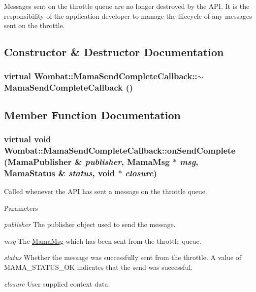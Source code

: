 Messages sent on the throttle queue are no longer destroyed by the API. It is the responsibility of the application developer to manage the lifecycle of any messages sent on the throttle. 

\subsection{Constructor \& Destructor Documentation}
\hypertarget{classWombat_1_1MamaSendCompleteCallback_ad4a151b81e17fecebeeda573bba405c3}{
\subsubsection[{$\sim$MamaSendCompleteCallback}]{\setlength{\rightskip}{0pt plus 5cm}virtual Wombat::MamaSendCompleteCallback::$\sim$MamaSendCompleteCallback ()}}
\label{classWombat_1_1MamaSendCompleteCallback_ad4a151b81e17fecebeeda573bba405c3}


\subsection{Member Function Documentation}
\hypertarget{classWombat_1_1MamaSendCompleteCallback_aa6f6cd10cb4b7b5c84c74056badd365f}{
\subsubsection[{onSendComplete}]{\setlength{\rightskip}{0pt plus 5cm}virtual void Wombat::MamaSendCompleteCallback::onSendComplete ({\bf MamaPublisher} \& {\em publisher}, \/  {\bf MamaMsg} $\ast$ {\em msg}, \/  {\bf MamaStatus} \& {\em status}, \/  void $\ast$ {\em closure})}}
\label{classWombat_1_1MamaSendCompleteCallback_aa6f6cd10cb4b7b5c84c74056badd365f}


Called whenever the API has sent a message on the throttle queue. 
\begin{DoxyParams}{Parameters}
\item[{\em publisher}]The publisher object used to send the message. \item[{\em msg}]The \hyperlink{classWombat_1_1MamaMsg}{MamaMsg} which has been sent from the throttle queue. \item[{\em status}]Whether the message was successfully sent from the throttle. A value of MAMA\_\-STATUS\_\-OK indicates that the send was successful. \item[{\em closure}]User supplied context data. \end{DoxyParams}
